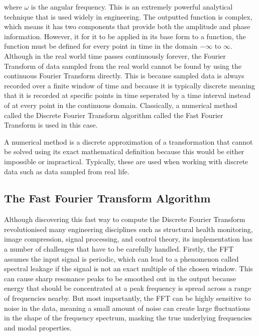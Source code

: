 \documentclass[12pt]{article}
\begin{document}
    \noindent where $\omega$ is the angular frequency.
    This is an extremely powerful analytical technique that is used widely in engineering.
    The outputted function is complex, which means it has two components that provide both the amplitude and phase information.
    However, it for it to be applied in its base form to a function, the function must be defined for every point in time in the domain $-\infty \text{ to } \infty$.
    Although in the real world time passes continuously forever, the Fourier Transform of data sampled from the real world cannot be found by using the continuous Fourier Transform directly.
    This is because sampled data is always recorded over a finite window of time and because it is typically discrete meaning that it is recorded at specific points in time seperated by a time interval instead of at every point in the continuous domain.
    Classically, a numerical method called the Discrete Fourier Transform algorithm called the Fast Fourier Transform is used in this case.

    A numerical method is a discrete approximation of a transformation that cannot be solved using its exact mathematical definition because this would be either impossible or impractical.
    Typically, these are used when working with discrete data such as data sampled from real life.

    \subsection{The Fast Fourier Transform Algorithm}
    Although discovering this fast way to compute the Discrete Fourier Transform revolutionised many engineering disciplines such as structural health monitoring, image compression, signal processing, and control theory\cite{Byjus2023}, its implementation has a number of challenges that have to be carefully handled.
    Firstly, the FFT assumes the input signal is periodic, which can lead to a phenomenon called spectral leakage if the signal is not an exact multiple of the chosen window\cite{MathStackExchange2023}.
    This can cause sharp resonance peaks to be smoothed out in the output because energy that should be concentrated at a peak frequency is spread across a range of frequencies nearby.
    But most importantly, the FFT can be highly sensitive to noise in the data, meaning a small amount of noise can create large fluctuations in the shape of the frequency spectrum, masking the true underlying frequencies and modal properties\cite{MathStackExchange2023}.
\end{document}
